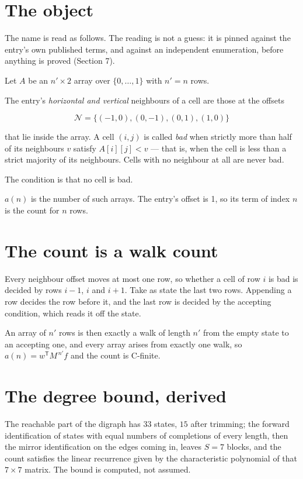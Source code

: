 \documentclass[11pt]{article}
\theoremstyle{definition}
\begin{document}
\section{The object}

The name is read as follows. The reading is not a guess: it is pinned against the entry's own published terms, and against an independent enumeration, before anything is proved (Section 7).

Let $A$ be an $n' \times 2$ array over $\{0,\dots,1\}$ with $n' = n$ rows.

The entry's {\itshape horizontal and vertical} neighbours of a cell are those at the offsets

\[\mathcal{N} = \{(-1,0), (0,-1), (0,1), (1,0)\}\]

that lie inside the array. A cell $(i,j)$ is called {\itshape bad} when strictly more than half of its neighbours $v$ satisfy $A[i][j] < v$ --- that is, when the cell is less than a strict majority of its neighbours. Cells with no neighbour at all are never bad.

The condition is that no cell is bad.

$a(n)$ is the number of such arrays. The entry's offset is 1, so its term of index $n$ is the count for $n$ rows.

\section{The count is a walk count}

Every neighbour offset moves at most one row, so whether a cell of row $i$ is bad is decided by rows $i-1$, $i$ and $i+1$. Take as state the last two rows. Appending a row decides the row before it, and the last row is decided by the accepting condition, which reads it off the state.

An array of $n'$ rows is then exactly a walk of length $n'$ from the empty state to an accepting one, and every array arises from exactly one walk, so $a(n) = w^{\mathsf T}M^{\,n'}f$ and the count is C-finite.

\section{The degree bound, derived}

The reachable part of the digraph has $33$ states, $15$ after trimming; the forward identification of states with equal numbers of completions of every length, then the mirror identification on the edges coming in, leaves $S = 7$ blocks, and the count satisfies the linear recurrence given by the characteristic polynomial of that $7\times7$ matrix. The bound is computed, not assumed.
\end{document}
